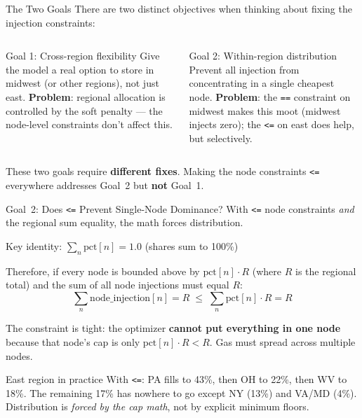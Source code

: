 \documentclass[aspectratio=169, 11pt]{beamer}
\begin{document}
\begin{frame}{The Two Goals}
  There are two distinct objectives when thinking about fixing the injection constraints:

  \vspace{0.5em}
  \begin{columns}[T]
      \begin{block}{Goal 1: Cross-region flexibility}
        Give the model a real option to store in midwest (or other regions), not just east.
        \textbf{Problem}: regional allocation is controlled by the soft penalty --- the node-level constraints don't affect this.
      \end{block}

      \begin{block}{Goal 2: Within-region distribution}
        Prevent all injection from concentrating in a single cheapest node.
        \textbf{Problem}: the \texttt{==} constraint on midwest makes this moot (midwest injects zero); the \texttt{<=} on east does help, but selectively.
      \end{block}
  \end{columns}

  \vspace{0.5em}
  These two goals require \textbf{different fixes}. Making the node constraints \texttt{<=} everywhere addresses Goal~2 but \textbf{not} Goal~1.
\end{frame}

\begin{frame}{Goal~2: Does \texttt{<=} Prevent Single-Node Dominance?}
  With \texttt{<=} node constraints \emph{and} the regional sum equality, the math forces distribution.

  \vspace{0.5em}
  Key identity: $\displaystyle\sum_n \text{pct}[n] = 1.0$ \quad (shares sum to 100\%)

  \vspace{0.3em}
  Therefore, if every node is bounded above by $\text{pct}[n] \cdot R$ (where $R$ is the regional total) and the sum of all node injections must equal $R$:
  \[
    \sum_n \text{node\_injection}[n] = R \;\leq\; \sum_n \text{pct}[n] \cdot R = R
  \]

  The constraint is tight: the optimizer \textbf{cannot put everything in one node} because that node's cap is only $\text{pct}[n] \cdot R < R$. Gas must spread across multiple nodes.

  \vspace{0.3em}
  \begin{example}{East region in practice}
    With \texttt{<=}: PA fills to 43\%, then OH to 22\%, then WV to 18\%. The remaining 17\% has nowhere to go except NY (13\%) and VA/MD (4\%). Distribution is \emph{forced by the cap math}, not by explicit minimum floors.
  \end{example}
\end{frame}
\end{document}
